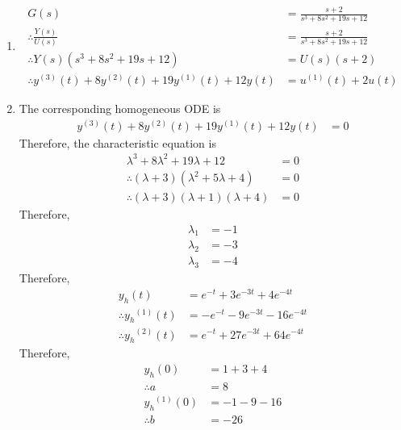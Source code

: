\documentclass[fleqn, a4paper, 11pt, oneside]{amsart}
\theoremstyle{definition}
\theoremstyle{theorem}
\begin{document}
\begin{solution}
	\begin{enumerate}[leftmargin=*]
		\item
			\begin{align*}
				G(s)                                                           & = \frac{s + 2}{s^3 + 8 s^2 + 19 s + 12} \\
				\therefore \frac{Y(s)}{U(s)}                                   & = \frac{s + 2}{s^3 + 8 s^2 + 19 s + 12} \\
				\therefore Y(s) \left( s^3 + 8 s^2 + 19 s + 12 \right)         & = U(s) (s + 2)                          \\
				\therefore y^{(3)}(t) + 8 y^{(2)}(t) + 19 y^{(1)}(t) + 12 y(t) & = u^{(1)}(t) + 2 u(t)
			\end{align*}
		\item
			The corresponding homogeneous ODE is
			\begin{align*}
				y^{(3)}(t) + 8 y^{(2)}(t) + 19 y^{(1)}(t) + 12 y(t) & = 0
			\end{align*}
			Therefore, the characteristic equation is
			\begin{align*}
				\lambda^3 + 8 \lambda^2 + 19 \lambda + 12            & = 0 \\
				\therefore (\lambda + 3) (\lambda^2 + 5 \lambda + 4) & = 0 \\
				\therefore (\lambda + 3) (\lambda + 1) (\lambda + 4) & = 0
			\end{align*}
			Therefore,
			\begin{align*}
				\lambda_1 & = -1 \\
				\lambda_2 & = -3 \\
				\lambda_3 & = -4
			\end{align*}
			Therefore,
			\begin{align*}
				y_h(t)                    & = e^{-t} + 3 e^{-3 t} + 4 e^{-4 t}   \\
				\therefore {y_h}^{(1)}(t) & = -e^{-t} - 9 e^{-3 t} - 16 e^{-4 t} \\
				\therefore {y_h}^{(2)}(t) & = e^{-t} + 27 e^{-3 t} + 64 e^{-4 t}
			\end{align*}
			Therefore,
			\begin{align*}
				y_h(0)         & = 1 + 3 + 4   \\
				\therefore a   & = 8           \\
				{y_h}^{(1)}(0) & = -1 - 9 - 16 \\
				\therefore b   & = -26         \\

\end{align*}
\end{enumerate}
\end{solution}
\end{document}
